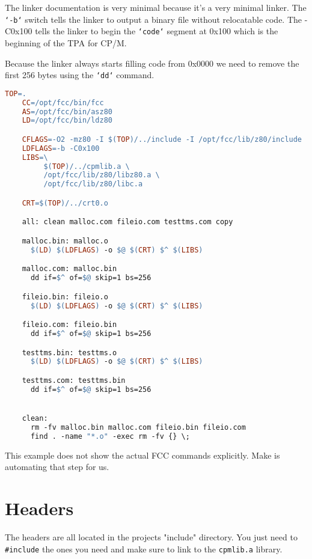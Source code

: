 \documentclass[10pt,a4paper]{article}
\begin{document}
The linker documentation is very minimal because it's a very minimal linker.
The \texttt{`-b`} switch tells the linker to output a binary file without
relocatable code.  The -C0x100 tells the linker to begin the \texttt{`code`}
segment at 0x100 which is the beginning of the TPA for CP/M.

Because the linker always starts filling code from 0x0000 we need to remove the
first 256 bytes using the \texttt{`dd`} command.
\pagebreak

\begin{center}
  \begin{lstlisting}[language=make, caption=Example Makefile]
    TOP=.
    CC=/opt/fcc/bin/fcc
    AS=/opt/fcc/bin/asz80
    LD=/opt/fcc/bin/ldz80

    CFLAGS=-O2 -mz80 -I $(TOP)/../include -I /opt/fcc/lib/z80/include
    LDFLAGS=-b -C0x100
    LIBS=\
         $(TOP)/../cpmlib.a \
         /opt/fcc/lib/z80/libz80.a \
         /opt/fcc/lib/z80/libc.a

    CRT=$(TOP)/../crt0.o

    all: clean malloc.com fileio.com testtms.com copy

    malloc.bin: malloc.o
      $(LD) $(LDFLAGS) -o $@ $(CRT) $^ $(LIBS)

    malloc.com: malloc.bin
      dd if=$^ of=$@ skip=1 bs=256

    fileio.bin: fileio.o
      $(LD) $(LDFLAGS) -o $@ $(CRT) $^ $(LIBS)

    fileio.com: fileio.bin
      dd if=$^ of=$@ skip=1 bs=256

    testtms.bin: testtms.o
      $(LD) $(LDFLAGS) -o $@ $(CRT) $^ $(LIBS)

    testtms.com: testtms.bin
      dd if=$^ of=$@ skip=1 bs=256


    clean:
      rm -fv malloc.bin malloc.com fileio.bin fileio.com
      find . -name "*.o" -exec rm -fv {} \;
  \end{lstlisting}
\end{center}
\label{lst:makefile}

This example does not show the actual FCC commands explicitly.  Make is
automating that step for us.
\pagebreak

\section{Headers}

The headers are all located in the projects "include" directory.  You just need
to \texttt{\#include} the ones you need and make sure to link to the
\texttt{cpmlib.a} library.
\end{document}
